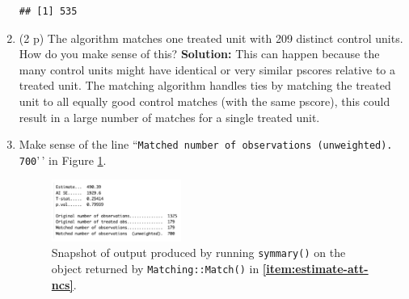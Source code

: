 \documentclass[
]{article}
\newenvironment{Shaded}{\begin{snugshade}}{\end{snugshade}}
\newcommand{\FunctionTok}[1]{\textcolor[rgb]{0.13,0.29,0.53}{\textbf{#1}}}
\newcommand{\NormalTok}[1]{#1}
\newcommand{\OtherTok}[1]{\textcolor[rgb]{0.56,0.35,0.01}{#1}}
\newcommand{\SpecialCharTok}[1]{\textcolor[rgb]{0.81,0.36,0.00}{\textbf{#1}}}
\newcommand{\StringTok}[1]{\textcolor[rgb]{0.31,0.60,0.02}{#1}}
\begin{document}
\begin{enumerate}
\begin{Shaded}
\end{Shaded}

\begin{verbatim}
## [1] 535
\end{verbatim}
\item
  (2 p) The algorithm matches one treated unit with 209 distinct control
  units. How do you make sense of this? \newline \textbf{Solution:} This
  can happen because the many control units might have identical or very
  similar pscores relative to a treated unit. The matching algorithm
  handles ties by matching the treated unit to all equally good control
  matches (with the same pscore), this could result in a large number of
  matches for a single treated unit.
\item
  Make sense of the line
  ``\texttt{Matched number of observations (unweighted). 700}'\,' in
  Figure \ref{fig:nnm_output}.

  \begin{figure}[h]
   \centering
   \captionsetup{width=.6\textwidth}
   \includegraphics[width=0.4\textwidth]{figures/q7_f.png}
   \caption{Snapshot of output produced by running \texttt{symmary()} on the object returned by \texttt{Matching::Match()} in \textbf{\ref{item:estimate-att-ncs}}.}
   \label{fig:nnm_output}
   \end{figure}

\begin{Shaded}
\end{Shaded}


\end{enumerate}
\end{document}
